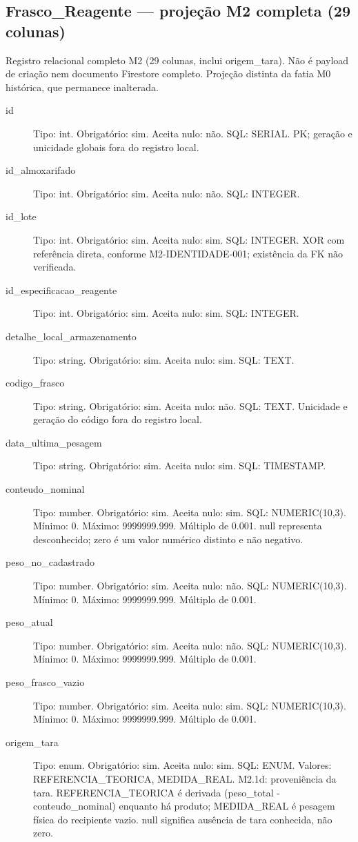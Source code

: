 \subsection*{Frasco\_Reagente --- projeção M2 completa (29 colunas)}
Registro relacional completo M2 (29 colunas, inclui origem\_tara). Não é payload de criação nem documento Firestore completo. Projeção distinta da fatia M0 histórica, que permanece inalterada.
\begin{description}
\item[id] Tipo: int. Obrigatório: sim. Aceita nulo: não.
SQL: SERIAL.
PK; geração e unicidade globais fora do registro local.
\item[id\_almoxarifado] Tipo: int. Obrigatório: sim. Aceita nulo: não.
SQL: INTEGER.
\item[id\_lote] Tipo: int. Obrigatório: sim. Aceita nulo: sim.
SQL: INTEGER.
XOR com referência direta, conforme M2-IDENTIDADE-001; existência da FK não verificada.
\item[id\_especificacao\_reagente] Tipo: int. Obrigatório: sim. Aceita nulo: sim.
SQL: INTEGER.
\item[detalhe\_local\_armazenamento] Tipo: string. Obrigatório: sim. Aceita nulo: sim.
SQL: TEXT.
\item[codigo\_frasco] Tipo: string. Obrigatório: sim. Aceita nulo: não.
SQL: TEXT.
Unicidade e geração do código fora do registro local.
\item[data\_ultima\_pesagem] Tipo: string. Obrigatório: sim. Aceita nulo: sim.
SQL: TIMESTAMP.
\item[conteudo\_nominal] Tipo: number. Obrigatório: sim. Aceita nulo: sim.
SQL: NUMERIC(10,3).
Mínimo: 0.
Máximo: 9999999.999.
Múltiplo de 0.001.
null representa desconhecido; zero é um valor numérico distinto e não negativo.
\item[peso\_no\_cadastrado] Tipo: number. Obrigatório: sim. Aceita nulo: não.
SQL: NUMERIC(10,3).
Mínimo: 0.
Máximo: 9999999.999.
Múltiplo de 0.001.
\item[peso\_atual] Tipo: number. Obrigatório: sim. Aceita nulo: não.
SQL: NUMERIC(10,3).
Mínimo: 0.
Máximo: 9999999.999.
Múltiplo de 0.001.
\item[peso\_frasco\_vazio] Tipo: number. Obrigatório: sim. Aceita nulo: sim.
SQL: NUMERIC(10,3).
Mínimo: 0.
Máximo: 9999999.999.
Múltiplo de 0.001.
\item[origem\_tara] Tipo: enum. Obrigatório: sim. Aceita nulo: sim.
SQL: ENUM.
Valores: REFERENCIA\_TEORICA, MEDIDA\_REAL.
M2.1d: proveniência da tara. REFERENCIA\_TEORICA é derivada (peso\_total - conteudo\_nominal) enquanto há produto; MEDIDA\_REAL é pesagem física do recipiente vazio. null significa ausência de tara conhecida, não zero.

\end{description}
